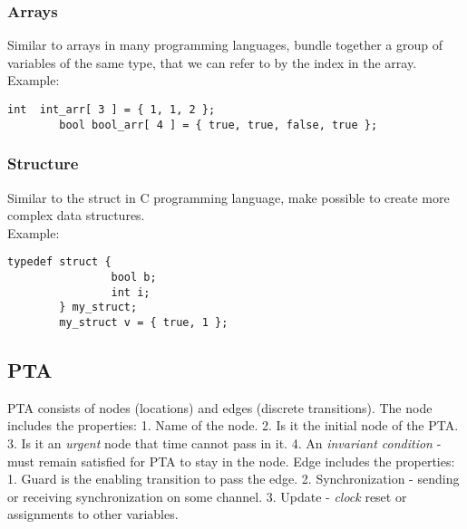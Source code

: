\subsubsection{Arrays}
Similar to arrays in many programming languages, bundle together a group of variables of the same type, that we can refer to by the index in the array.\\
Example:\begin{lstlisting}[style=styleuppaal]
        int  int_arr[ 3 ] = { 1, 1, 2 };
        bool bool_arr[ 4 ] = { true, true, false, true }; \end{lstlisting}
\subsubsection{Structure}
Similar to the struct in C programming language, make possible to create more complex data structures.\\
Example:\begin{lstlisting}[style=styleuppaal]
        typedef struct {
                bool b;
                int i;
        } my_struct;
        my_struct v = { true, 1 }; \end{lstlisting}
\subsection{PTA }
PTA consists of nodes (locations) and edges (discrete transitions). The node includes the properties: 1. Name of the node. 2. Is it the initial node of the PTA. 3. Is it an \textit{urgent} node that time cannot pass in it. 4. An \textit{\textit{invariant condition}} - must remain satisfied for PTA to stay in the node. Edge includes the properties: 1. Guard is the enabling transition to pass the edge. 2. Synchronization - sending or receiving synchronization on some channel. 3. Update - \textit{clock} reset or assignments to other variables.\\

